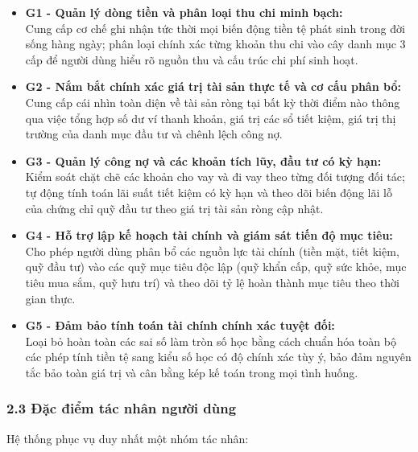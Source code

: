\documentclass[11pt,a4paper]{article}
\begin{document}
\begin{itemize}
\item
  \textbf{G1 - Quản lý dòng tiền và phân loại thu chi minh bạch:}\\
  Cung cấp cơ chế ghi nhận tức thời mọi biến động tiền tệ phát sinh
  trong đời sống hàng ngày; phân loại chính xác từng khoản thu chi vào
  cây danh mục 3 cấp để người dùng hiểu rõ nguồn thu và cấu trúc chi phí
  sinh hoạt.
\item
  \textbf{G2 - Nắm bắt chính xác giá trị tài sản thực tế và cơ cấu phân
  bổ:}\\
  Cung cấp cái nhìn toàn diện về tài sản ròng tại bất kỳ thời điểm nào
  thông qua việc tổng hợp số dư ví thanh khoản, giá trị các sổ tiết
  kiệm, giá trị thị trường của danh mục đầu tư và chênh lệch công nợ.
\item
  \textbf{G3 - Quản lý công nợ và các khoản tích lũy, đầu tư có kỳ
  hạn:}\\
  Kiểm soát chặt chẽ các khoản cho vay và đi vay theo từng đối tượng đối
  tác; tự động tính toán lãi suất tiết kiệm có kỳ hạn và theo dõi biến
  động lãi lỗ của chứng chỉ quỹ đầu tư theo giá trị tài sản ròng cập
  nhật.
\item
  \textbf{G4 - Hỗ trợ lập kế hoạch tài chính và giám sát tiến độ mục
  tiêu:}\\
  Cho phép người dùng phân bổ các nguồn lực tài chính (tiền mặt, tiết
  kiệm, quỹ đầu tư) vào các quỹ mục tiêu độc lập (quỹ khẩn cấp, quỹ sức
  khỏe, mục tiêu mua sắm, quỹ hưu trí) và theo dõi tỷ lệ hoàn thành mục
  tiêu theo thời gian thực.
\item
  \textbf{G5 - Đảm bảo tính toán tài chính chính xác tuyệt đối:}\\
  Loại bỏ hoàn toàn các sai số làm tròn số học bằng cách chuẩn hóa toàn
  bộ các phép tính tiền tệ sang kiểu số học có độ chính xác tùy ý, bảo
  đảm nguyên tắc bảo toàn giá trị và cân bằng kép kế toán trong mọi tình
  huống.
\end{itemize}

\subsubsection{2.3 Đặc điểm tác nhân người
dùng}\label{23-ux111ux1eb7c-ux111iux1ec3m-tuxe1c-nhuxe2n-ngux1b0ux1eddi-duxf9ng}

Hệ thống phục vụ duy nhất một nhóm tác nhân:
\end{document}
